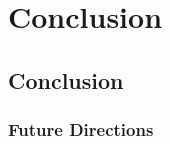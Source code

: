 \documentclass[12pt,oneside,final]{thesis}
\begin{document}
\chapter{Conclusion}
\label{sec:conclusion}

\section{Conclusion}
\subsection{Future Directions}








% 
% 
% 
% 
% 
\end{document}
